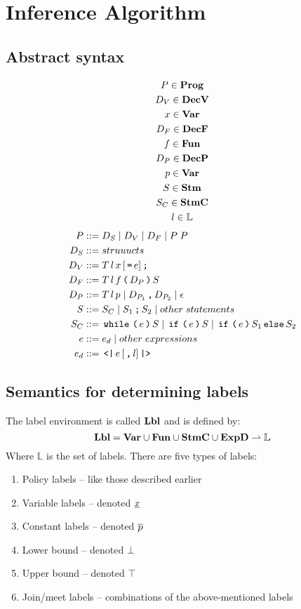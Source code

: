 
\section{Inference Algorithm}

\subsection{Abstract syntax}

\begin{gather*}
  P \in \mathbf{Prog}\\
  D_V \in \mathbf{DecV}\\
  x \in \mathbf{Var}\\
  D_F \in \mathbf{DecF} \\
  f \in \mathbf{Fun}\\
  D_P \in \mathbf{DecP}\\
  p \in \mathbf{Var}\\
  S \in \mathbf{Stm}\\
  S_C \in \mathbf{StmC}\\
  l \in \mathbb{L}\\
\end{gather*}
\begin{align*}
  P       & ::= D_S \gp D_V \gp D_F \gp P \; P\\
  D_S     & ::= struuucts\\
  D_V     & ::= T \, l \, x \, [\tk = e] \tk ;\\
  D_F     & ::= T \, l \, f \tk ( D_P \tk ) S\\
  D_P     & ::= T \, l \, p \gp D_{P_1} \tk , D_{P_2} \gp \epsilon\\
  S       & ::= S_C \gp S_1 \tk ; S_2 \gp other \; statements\\
  S_C     & ::= \tk{while} \tk ( e \tk ) S \gp \tk{if} \tk ( e \tk ) S \gp \tk{if} \tk ( e \tk ) S_1 \tk{else} S_2\\
  e       & ::= e_d \gp other \; expressions\\
  e_d     & ::= \tk{<|} e \, [\tk , l] \tk{|>}
\end{align*}

\subsection{Semantics for determining labels}
The label environment is called $\mathbf{Lbl}$ and is defined by:
\[
  \mathbf{Lbl} = \mathbf{Var} \cup \mathbf{Fun} \cup \mathbf{StmC} \cup \mathbf{ExpD} \rightharpoonup \mathbb{L}
\]
Where $\mathbb{L}$ is the set of labels.
There are five types of labels:
\begin{enumerate}
  \item Policy labels -- like those described earlier
  \item Variable labels -- denoted $\underline{x}$
  \item Constant labels -- denoted $\overline{p}$
  \item Lower bound -- denoted $\bot$
  \item Upper bound -- denoted $\top$
  \item Join/meet labels -- combinations of the above-mentioned labels
\end{enumerate}

